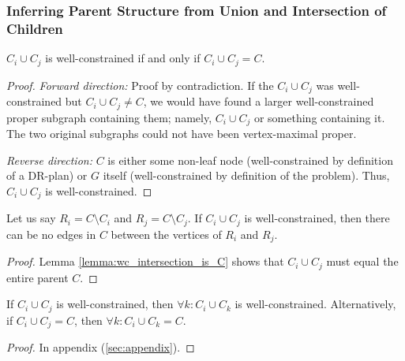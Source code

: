 
\subsubsection{Inferring Parent Structure from Union and Intersection of Children}
\label{sec:infer_parent}


\begin{lemma}\label{lemma:wc_intersection_is_C}
$C_i\cup C_j$ is well-constrained if and only if $C_i\cup C_j = C$.
\end{lemma}

\begin{proof}
\textit{Forward direction:} Proof by contradiction. If the $C_i\cup C_j$ was well-constrained but $C_i\cup C_j \neq C$, we would have found a larger well-constrained proper subgraph containing them; namely, $C_i\cup C_j$ or something containing it. The two original subgraphs could not have been vertex-maximal proper.

\textit{Reverse direction:} $C$ is either some non-leaf node (well-constrained by definition of a DR-plan) or $G$ itself (well-constrained by definition of the problem). Thus, $C_i\cup C_j$ is well-constrained.
\end{proof}

\begin{corollary}\label{corollary:no_edges_between_diff}
Let us say $R_i=C\setminus C_i$ and $R_j=C\setminus C_j$. If $C_i\cup C_j$ is well-constrained, then there can be no edges in $C$ between the vertices of $R_i$ and $R_j$.
\end{corollary}

\begin{proof}
Lemma \ref{lemma:wc_intersection_is_C} shows that $C_i\cup C_j$ must equal the entire parent $C$.
\end{proof}



\begin{lemma}\label{lemma:wc_intersection_makes_all_wc}
If $C_i\cup C_j$ is well-constrained, then $\forall k: C_i\cup C_k$ is well-constrained.
Alternatively, if $C_i\cup C_j=C$, then $\forall k: C_i\cup C_k=C$.
\end{lemma}

\begin{proof}
In appendix (\ref{sec:appendix}).
\end{proof}



